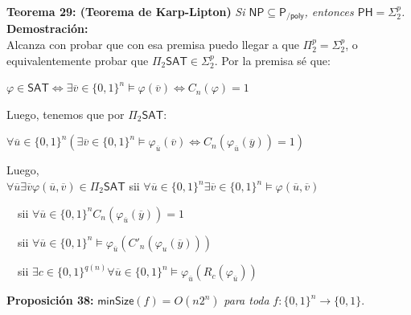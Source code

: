 \documentclass{article}
\begin{document}
\begin{flushleft}
  \textbf{Teorema 29: \hypertarget{karpLipton}{\textcolor{Bittersweet}{(Teorema de Karp-Lipton)}}}
  \textit{Si $\mathsf{NP \subseteq P_{/poly}}$, entonces $\mathsf{PH} = \Sigma^p_2$.} \\[0.5em]

  \textbf{\textcolor{Mulberry}{Demostración:}} \\[0.5em]

  Alcanza con probar que con esa premisa puedo llegar a que $\Pi_2^p = \Sigma_2^p$, o equivalentemente probar que $\Pi_2
  \mathsf{SAT} \in \Sigma_2^p$. Por la premisa sé que:
\end{flushleft}
\begin{center}
  $\varphi \in \mathsf{SAT} \iff \exists \overline{v} \in \{0,1\}^n \models \varphi(\overline{v}) \iff C_n(\varphi) = 1$
\end{center}
\begin{flushleft}
  Luego, tenemos que por $\Pi_2 \mathsf{SAT}$:
\end{flushleft}
\begin{center}
  $\forall \overline{u} \in \{0,1\}^n \left( \exists \overline{v} \in \{0,1\}^n \models \varphi_{\overline{u}}(\overline{v})
  \iff C_n(\varphi_{\overline{u}}(\overline{y})) = 1 \right)$
\end{center}
\begin{flushleft}
  Luego, \\[0.5em]

  \qquad $\forall \overline{u} \exists \overline{v} \varphi(\overline{u}, \overline{v}) \in \Pi_2\mathsf{SAT}$ sii $\forall 
  \overline{u} \in \{0,1\}^n \exists \overline{v} \in \{0,1\}^n \models \varphi(\overline{u}, \overline{v})$

  \qquad \qquad \qquad \qquad \qquad \quad \ \ sii $\forall \overline{u} \in \{0,1\}^n C_n(\varphi_{\overline{u}}(\overline{y}))
  =1$

  \qquad \qquad \qquad \qquad \qquad \quad \ \ sii $\forall \overline{u} \in \{0,1\}^n \models \varphi_{\overline{u}}
  (C'_n(\varphi_{u}(\overline{y})))$

  \qquad \qquad \qquad \qquad \qquad \quad \ \ sii $\exists c \in \{0,1\}^{q(n)} \forall \overline{u} \in \{0,1\}^n \models
  \varphi_{\overline{u}}(R_c(\varphi_{\overline{u}}))$
\end{flushleft}


\begin{flushleft}
  \textbf{Proposición 38:}
  $\mathsf{minSize}(f) = O(n2^n)$ \textit{para toda} $f : \{0,1\}^n \rightarrow \{0,1\}$.
\end{flushleft}
\end{document}

